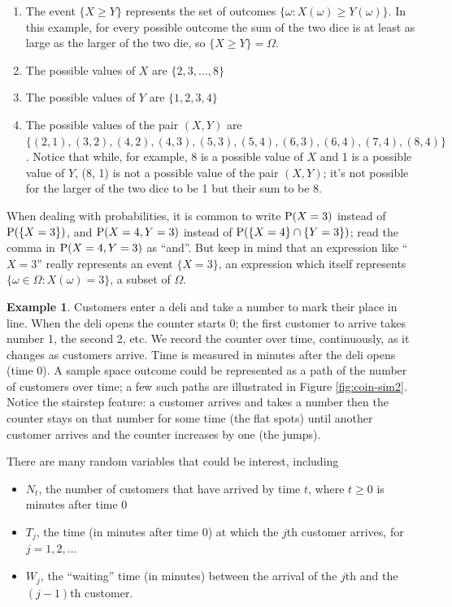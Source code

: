 \documentclass[
]{book}
\providecommand{\tightlist}{%
  \setlength{\itemsep}{0pt}\setlength{\parskip}{0pt}}
\theoremstyle{definition}
\theoremstyle{definition}
\newtheorem{example}{Example}[chapter]
\theoremstyle{definition}
\theoremstyle{remark}
\begin{document}
\begin{enumerate}
\item
  The event \(\{X\ge Y\}\) represents the set of outcomes \(\{\omega: X(\omega) \ge Y(\omega)\}\). In this example, for every possible outcome the sum of the two dice is at least as large as the larger of the two die, so \(\{X \ge Y\} = \Omega\).
\item
  The possible values of \(X\) are \(\{2, 3, \ldots, 8\}\)
\item
  The possible values of \(Y\) are \(\{1, 2, 3, 4\}\)
\item
  The possible values of the pair \((X, Y)\) are \(\{(2, 1), (3, 2), (4, 2), (4, 3), (5, 3), (5, 4), (6, 3), (6, 4), (7, 4), (8,4)\}\). Notice that while, for example, 8 is a possible value of \(X\) and 1 is a possible value of \(Y\), (8, 1) is not a possible value of the pair \((X, Y)\); it's not possible for the larger of the two dice to be 1 but their sum to be 8.
\end{enumerate}

When dealing with probabilities, it is common to write \(\textrm{P}(X=3)\) instead of \(\textrm{P}(\{X=3\})\), and \(\textrm{P}(X = 4, Y = 3)\) instead of \(\textrm{P}(\{X = 4\}\cap \{Y = 3\})\); read the comma in \(\textrm{P}(X = 4, Y = 3)\) as ``and''. But keep in mind that an expression like ``\(X=3\)'' really represents an event \(\{X=3\}\), an expression which itself represents \(\{\omega\in\Omega: X(\omega) = 3\}\), a subset of \(\Omega\).

\begin{example}
\protect\hypertarget{exm:PP-rv}{}{\label{exm:PP-rv} }
Customers enter a deli and take a number to mark their place in line. When the deli opens the counter starts 0; the first customer to arrive takes number 1, the second 2, etc. We record the counter over time, continuously, as it changes as customers arrive. Time is measured in minutes after the deli opens (time 0). A sample space outcome could be represented as a path of the number of customers over time; a few such paths are illustrated in Figure \ref{fig:coin-sim2}. Notice the stairstep feature: a customer arrives and takes a number then the counter stays on that number for some time (the flat spots) until another customer arrives and the counter increases by one (the jumps).

There are many random variables that could be interest, including

\begin{itemize}
\tightlist
\item
  \(N_t\), the number of customers that have arrived by time \(t\), where \(t\ge0\) is minutes after time 0
\item
  \(T_j\), the time (in minutes after time 0) at which the \(j\)th customer arrives, for \(j=1, 2, \ldots\)
\item
  \(W_j\), the ``waiting'' time (in minutes) between the arrival of the \(j\)th and the \((j-1)\)th customer.
\end{itemize}
\end{example}
\end{document}
